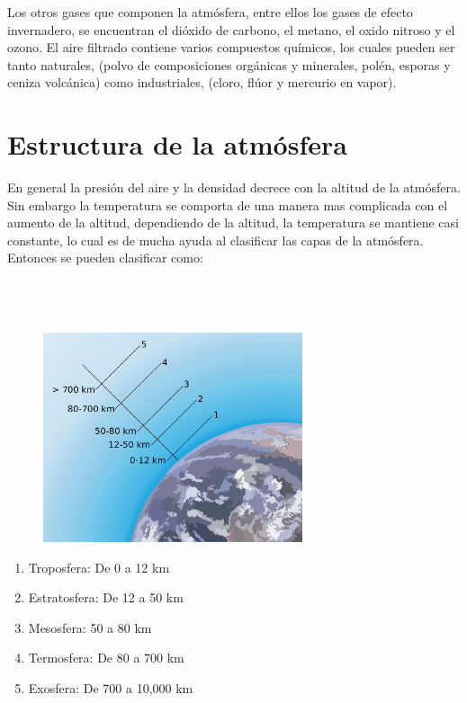 \documentclass{article} %
\begin{document}
Los otros gases que componen la atmósfera, entre ellos los gases de efecto invernadero, se encuentran el dióxido de carbono, el metano, el oxido nitroso y el ozono. El aire filtrado contiene varios compuestos químicos, los cuales pueden ser tanto naturales, (polvo de composiciones orgánicas y minerales, polén, esporas y ceniza volcánica) como industriales, (cloro, flúor y mercurio en vapor).

\section{Estructura de la atmósfera}

En general la presión del aire y la densidad decrece con la altitud de la atmósfera. Sin embargo la temperatura se comporta de una manera mas complicada con el aumento de la altitud, dependiendo de la altitud, la temperatura se mantiene casi constante, lo cual es de mucha ayuda al clasificar las capas de la atmósfera. Entonces se pueden clasificar como: \\\\\\\\

\begin{figure}[h]
    \centering
\includegraphics[width=3in]{atm2.png}
\end{figure}

\begin{enumerate}
    \centering
    \item Troposfera: De 0 a 12 km
    \item Estratosfera: De 12 a 50 km
    \item Mesosfera: 50 a 80 km
    \item Termosfera: De 80 a 700 km
    \item Exosfera: De 700 a 10,000 km
\end{enumerate}
\end{document}
